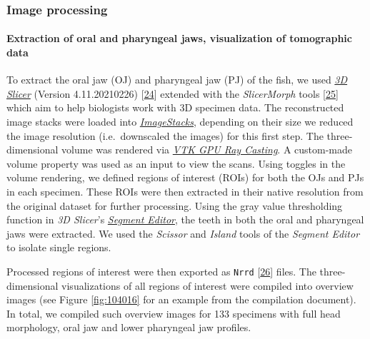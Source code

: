 \hypertarget{image-processing}{%
\subsubsection{Image processing}\label{image-processing}}

\hypertarget{extraction-of-oral-and-pharyngeal-jaws-visualization-of-tomographic-data}{%
\paragraph{Extraction of oral and pharyngeal jaws, visualization of tomographic data}\label{extraction-of-oral-and-pharyngeal-jaws-visualization-of-tomographic-data}}

To extract the oral jaw (OJ) and pharyngeal jaw (PJ) of the fish, we used \href{https://www.slicer.org}{\emph{3D Slicer}} (Version 4.11.20210226) {[}\protect\hyperlink{ref-OsCpHsJH}{24}{]} extended with the \emph{SlicerMorph} tools {[}\protect\hyperlink{ref-MwdN6kPV}{25}{]} which aim to help biologists work with 3D specimen data.
The reconstructed image stacks were loaded into \href{https://www.slicer.org/wiki/Documentation/Labs/ImageStacks}{\emph{ImageStacks}}, depending on their size we reduced the image resolution (i.e.~downscaled the images) for this first step.
The three-dimensional volume was rendered via \href{https://slicer.readthedocs.io/en/latest/user_guide/modules/volumerendering.html}{\emph{VTK GPU Ray Casting}}.
A custom-made volume property was used as an input to view the scans.
Using toggles in the volume rendering, we defined regions of interest (ROIs) for both the OJs and PJs in each specimen.
These ROIs were then extracted in their native resolution from the original dataset for further processing.
Using the gray value thresholding function in \emph{3D Slicer}'s \href{https://slicer.readthedocs.io/en/latest/user_guide/modules/segmenteditor.html}{\emph{Segment Editor}}, the teeth in both the oral and pharyngeal jaws were extracted.
We used the \emph{Scissor} and \emph{Island} tools of the \emph{Segment Editor} to isolate single regions.

Processed regions of interest were then exported as \texttt{Nrrd} {[}\protect\hyperlink{ref-rn6XbmFW}{26}{]} files.
The three-dimensional visualizations of all regions of interest were compiled into overview images (see Figure \ref{fig:104016} for an example from the compilation document).
In total, we compiled such overview images for 133 specimens with full head morphology, oral jaw and lower pharyngeal jaw profiles.

